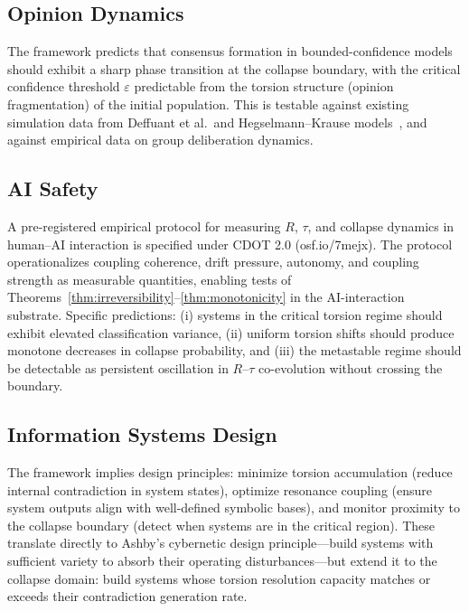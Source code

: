 \documentclass[11pt]{article}
\theoremstyle{plain}
\begin{document}
\subsection{Opinion Dynamics}

The framework predicts that consensus formation in bounded-confidence models should exhibit a
sharp phase transition at the collapse boundary, with the critical confidence threshold
$\varepsilon$ predictable from the torsion structure (opinion fragmentation) of the initial
population. This is testable against existing simulation data from Deffuant et al.\ and
Hegselmann--Krause models~\cite{deffuant2000, hegselmann2002}, and against empirical data on group
deliberation dynamics.

\subsection{AI Safety}

A pre-registered empirical protocol for measuring $R$, $\tau$, and collapse dynamics in human--AI
interaction is specified under CDOT 2.0 (osf.io/7mejx). The protocol operationalizes coupling
coherence, drift pressure, autonomy, and coupling strength as measurable quantities, enabling tests
of Theorems~\ref{thm:irreversibility}--\ref{thm:monotonicity} in the AI-interaction substrate.
Specific predictions: (i) systems in the critical torsion regime should exhibit elevated
classification variance, (ii) uniform torsion shifts should produce monotone decreases in collapse
probability, and (iii) the metastable regime should be detectable as persistent oscillation in
$R$--$\tau$ co-evolution without crossing the boundary.

\subsection{Information Systems Design}

The framework implies design principles: minimize torsion accumulation (reduce internal
contradiction in system states), optimize resonance coupling (ensure system outputs align with
well-defined symbolic bases), and monitor proximity to the collapse boundary (detect when systems
are in the critical region). These translate directly to Ashby's cybernetic design
principle---build systems with sufficient variety to absorb their operating disturbances---but
extend it to the collapse domain: build systems whose torsion resolution capacity matches or
exceeds their contradiction generation rate.
\end{document}
